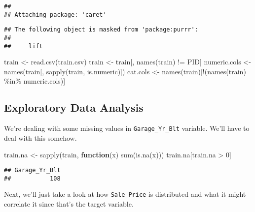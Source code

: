 \documentclass[
]{article}
\newenvironment{Shaded}{\begin{snugshade}}{\end{snugshade}}
\newcommand{\ControlFlowTok}[1]{\textcolor[rgb]{0.13,0.29,0.53}{\textbf{#1}}}
\newcommand{\DecValTok}[1]{\textcolor[rgb]{0.00,0.00,0.81}{#1}}
\newcommand{\FunctionTok}[1]{\textcolor[rgb]{0.00,0.00,0.00}{#1}}
\newcommand{\NormalTok}[1]{#1}
\newcommand{\OtherTok}[1]{\textcolor[rgb]{0.56,0.35,0.01}{#1}}
\newcommand{\SpecialCharTok}[1]{\textcolor[rgb]{0.00,0.00,0.00}{#1}}
\newcommand{\StringTok}[1]{\textcolor[rgb]{0.31,0.60,0.02}{#1}}
\begin{document}
\begin{verbatim}
## 
## Attaching package: 'caret'
\end{verbatim}

\begin{verbatim}
## The following object is masked from 'package:purrr':
## 
##     lift
\end{verbatim}

\begin{Shaded}
\begin{Highlighting}[]
\NormalTok{train }\OtherTok{\textless{}{-}} \FunctionTok{read.csv}\NormalTok{(}\StringTok{\textquotesingle{}train.csv\textquotesingle{}}\NormalTok{)}
\NormalTok{train }\OtherTok{\textless{}{-}}\NormalTok{ train[, }\FunctionTok{names}\NormalTok{(train) }\SpecialCharTok{!=} \StringTok{\textquotesingle{}PID\textquotesingle{}}\NormalTok{]}
\NormalTok{numeric.cols }\OtherTok{\textless{}{-}} \FunctionTok{names}\NormalTok{(train[, }\FunctionTok{sapply}\NormalTok{(train, is.numeric)])}
\NormalTok{cat.cols }\OtherTok{\textless{}{-}} \FunctionTok{names}\NormalTok{(train)[}\SpecialCharTok{!}\NormalTok{(}\FunctionTok{names}\NormalTok{(train) }\SpecialCharTok{\%in\%}\NormalTok{  numeric.cols)]}
\end{Highlighting}
\end{Shaded}

\hypertarget{exploratory-data-analysis}{%
\subsection{Exploratory Data Analysis}\label{exploratory-data-analysis}}

We're dealing with some missing values in \texttt{Garage\_Yr\_Blt}
variable. We'll have to deal with this somehow.

\begin{Shaded}
\begin{Highlighting}[]
\NormalTok{train.na }\OtherTok{\textless{}{-}} \FunctionTok{sapply}\NormalTok{(train, }\ControlFlowTok{function}\NormalTok{(x) }\FunctionTok{sum}\NormalTok{(}\FunctionTok{is.na}\NormalTok{(x)))}
\NormalTok{train.na[train.na }\SpecialCharTok{\textgreater{}} \DecValTok{0}\NormalTok{]}
\end{Highlighting}
\end{Shaded}

\begin{verbatim}
## Garage_Yr_Blt 
##           108
\end{verbatim}

Next, we'll just take a look at how \texttt{Sale\_Price} is distributed
and what it might correlate it since that's the target variable.
\end{document}
